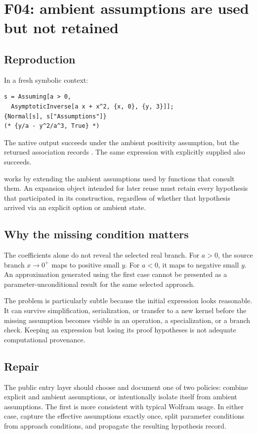 \documentclass[11pt,a4paper]{article}
\newcommand{\code}[1]{\texttt{\detokenize{#1}}}
\begin{document}
\section{F04: ambient assumptions are used but not retained}

\subsection{Reproduction}
In a fresh symbolic context:
\begin{lstlisting}
s = Assuming[a > 0,
  AsymptoticInverse[a x + x^2, {x, 0}, {y, 3}]];
{Normal[s], s["Assumptions"]}
(* {y/a - y^2/a^3, True} *)
\end{lstlisting}
The native output succeeds under the ambient positivity assumption, but the returned association records \code{True}. The same expression with \code{Assumptions -> a > 0} explicitly supplied also succeeds.

\code{Assuming} works by extending the ambient assumptions used by functions that consult them. An expansion object intended for later reuse must retain every hypothesis that participated in its construction, regardless of whether that hypothesis arrived via an explicit option or ambient state.\cite{wassuming}

\subsection{Why the missing condition matters}
The coefficients alone do not reveal the selected real branch. For $a>0$, the source branch $x\to0^+$ maps to positive small $y$. For $a<0$, it maps to negative small $y$. An approximation generated using the first case cannot be presented as a parameter-unconditional result for the same selected approach.

The problem is particularly subtle because the initial expression looks reasonable. It can survive simplification, serialization, or transfer to a new kernel before the missing assumption becomes visible in an operation, a specialization, or a branch check. Keeping an expression but losing its proof hypotheses is not adequate computational provenance.

\subsection{Repair}
The public entry layer should choose and document one of two policies: combine explicit and ambient assumptions, or intentionally isolate itself from ambient assumptions. The first is more consistent with typical Wolfram usage. In either case, capture the effective assumptions exactly once, split parameter conditions from approach conditions, and propagate the resulting hypothesis record.
\end{document}
